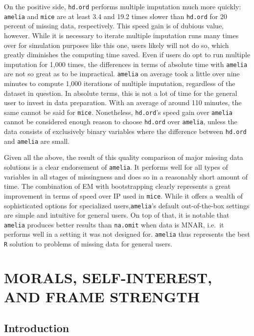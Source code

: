 \documentclass[12pt,econ]{sources/authesis}
\begin{document}
On the positive side, \texttt{hd.ord} performs multiple imputation much more quickly: \texttt{amelia} and \texttt{mice} are at least 3.4 and 19.2 times slower than \texttt{hd.ord} for 20 percent of missing data, respectively. This speed gain is of dubious value, however. While it is necessary to iterate multiple imputation runs many times over for simulation purposes like this one, users likely will not do so, which greatly diminishes the computing time saved. Even if users do opt to run multiple imputation for 1,000 times, the differences in terms of absolute time with \texttt{amelia} are not so great as to be impractical. \texttt{amelia} on average took a little over nine minutes to compute 1,000 iterations of multiple imputation, regardless of the dataset in question. In absolute terms, this is not a lot of time for the general user to invest in data preparation. With an average of around 110 minutes, the same cannot be said for \texttt{mice}. Nonetheless, \texttt{hd.ord}'s speed gain over \texttt{amelia} cannot be considered enough reason to choose \texttt{hd.ord} over \texttt{amelia}, unless the data consists of exclusively binary variables where the difference between \texttt{hd.ord} and \texttt{amelia} are small.

Given all the above, the result of this quality comparison of major missing data solutions is a clear endorsement of \texttt{amelia}. It performs well for all types of variables in all stages of missingness and does so in a reasonably short amount of time. The combination of EM with bootstrapping clearly represents a great improvement in terms of speed over IP used in \texttt{mice}. While it offers a wealth of sophisticated options for specialized users,\texttt{amelia}'s default out-of-the-box settings are simple and intuitive for general users. On top of that, it is notable that \texttt{amelia} produces better results than \texttt{na.omit} when data is MNAR, i.e.~it performs well in a setting it was not designed for. \texttt{amelia} thus represents the best \texttt{R} solution to problems of missing data for general users.

\hypertarget{framing}{%
\chapter{MORALS, SELF-INTEREST, AND FRAME STRENGTH}\label{framing}}

\hypertarget{framing-intro}{%
\section{Introduction}\label{framing-intro}}
\end{document}
